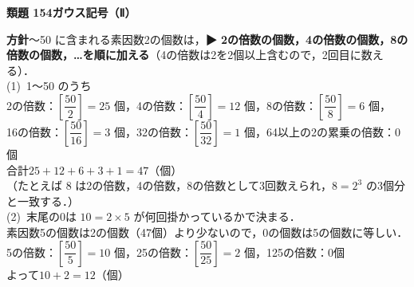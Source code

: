 \documentclass[a4paper,11pt]{ltjsarticle}
\newcommand{\ans}[2]{\Needspace{5\baselineskip}\vspace{6pt}%
  {\sffamily\bfseries 類題 #1\quad #2}\par}
\newcommand{\point}[1]{\textsf{\bfseries ▶ #1}}
\begin{document}
\ans{154}{ガウス記号（Ⅱ）}
\begin{kai}
\textbf{方針}〜50 に含まれる素因数2の個数は，\point{2の倍数の個数，4の倍数の個数，8の倍数の個数，…を順に加える}（4の倍数は2を2個以上含むので，2回目に数える）．\\[2pt]
(1)\ 1〜50 のうち\\
\hspace*{1.5em}2の倍数：$\left[\dfrac{50}{2}\right]=25$ 個，\quad 4の倍数：$\left[\dfrac{50}{4}\right]=12$ 個，\quad 8の倍数：$\left[\dfrac{50}{8}\right]=6$ 個，\\
\hspace*{1.5em}16の倍数：$\left[\dfrac{50}{16}\right]=3$ 個，\quad 32の倍数：$\left[\dfrac{50}{32}\right]=1$ 個，\quad 64以上の2の累乗の倍数：0個\\
\hspace*{1.5em}合計\quad $25+12+6+3+1=47$（個）\\
\hspace*{1.5em}（たとえば 8 は2の倍数，4の倍数，8の倍数として3回数えられ，$8=2^3$ の3個分と一致する．）\\[2pt]
(2)\ 末尾の0は $10=2\times5$ が何回掛かっているかで決まる．\\
\hspace*{1.5em}素因数5の個数は2の個数（47個）より少ないので，0の個数は5の個数に等しい．\\
\hspace*{1.5em}5の倍数：$\left[\dfrac{50}{5}\right]=10$ 個，\quad 25の倍数：$\left[\dfrac{50}{25}\right]=2$ 個，\quad 125の倍数：0個\\
\hspace*{1.5em}よって\quad $10+2=12$（個）
\end{kai}
\end{document}
